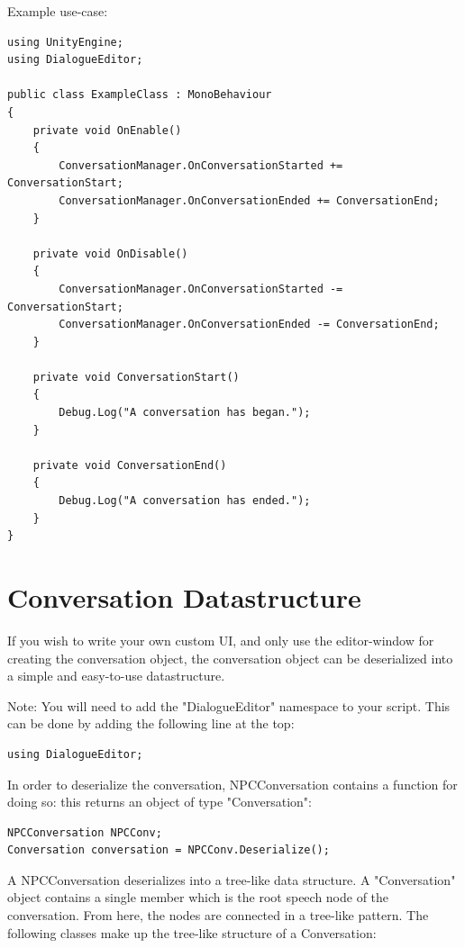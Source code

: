 \documentclass[a4paper,12pt]{article}
\begin{document}
Example use-case:
\bigskip

\begin{lstlisting}
using UnityEngine;
using DialogueEditor;

public class ExampleClass : MonoBehaviour
{
	private void OnEnable()
	{
		ConversationManager.OnConversationStarted += ConversationStart;
		ConversationManager.OnConversationEnded += ConversationEnd;
	}
	
	private void OnDisable()
	{
		ConversationManager.OnConversationStarted -= ConversationStart;
		ConversationManager.OnConversationEnded -= ConversationEnd;
	}
	
	private void ConversationStart()
	{
		Debug.Log("A conversation has began.");
	}
	
	private void ConversationEnd()
	{
		Debug.Log("A conversation has ended.");
	}
}
\end{lstlisting}

\newpage

\section{Conversation Datastructure}
\hypertarget{_datastructure}{}

If you wish to write your own custom UI, and only use the editor-window for creating the conversation object, the conversation object can be deserialized into a simple and easy-to-use datastructure.

Note: You will need to add the "DialogueEditor" namespace to your script. This can be done by adding the following line at the top:
\bigskip

\begin{lstlisting}
using DialogueEditor;
\end{lstlisting}
\bigskip

In order to deserialize the conversation, NPCConversation contains a function for doing so: this returns an object of type "Conversation":
\bigskip

\begin{lstlisting}
NPCConversation NPCConv;
Conversation conversation = NPCConv.Deserialize();
\end{lstlisting}
\bigskip

A NPCConversation deserializes into a tree-like data structure. A "Conversation" object contains a single member which is the root speech node of the conversation. From here, the nodes are connected in a tree-like pattern. The following classes make up the tree-like structure of a Conversation:
\bigskip
\end{document}
